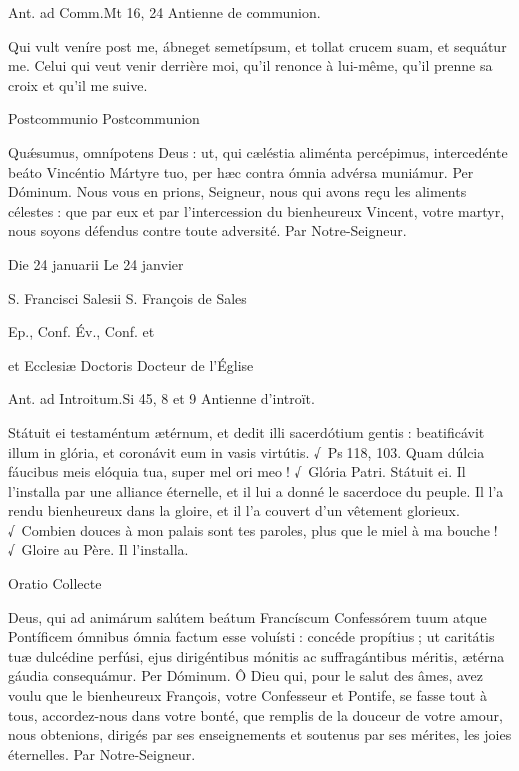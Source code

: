 \begin{paracol}{2}
Ant. ad Comm.\hfill Mt 16, 24
\switchcolumn
Antienne de communion.
\switchcolumn*

Qui vult veníre post me, ábneget semetípsum, et tollat crucem suam, et sequátur me.
\switchcolumn
Celui qui veut venir derrière moi, qu’il renonce à lui-même, qu’il prenne sa croix et qu’il me suive.
\switchcolumn*

Postcommunio
\switchcolumn
Postcommunion
\switchcolumn*

Quǽsumus, omnípotens Deus : ut,  qui cæléstia aliménta percépimus, intercedénte beáto Vincéntio Mártyre tuo, per hæc contra ómnia advérsa muniámur. Per Dóminum.
\switchcolumn
Nous vous en prions, Seigneur, nous qui  avons reçu les aliments célestes : que par eux et par l’intercession du bienheureux Vincent, votre martyr, nous soyons défendus contre toute adversité. Par Notre-Seigneur.
\switchcolumn*

Die 24 januarii
\switchcolumn
Le 24 janvier
\switchcolumn*

S. Francisci Salesii
\switchcolumn
S. François de Sales
\switchcolumn*

Ep., Conf.
\switchcolumn
Év., Conf. et
\switchcolumn*

et Ecclesiæ Doctoris
\switchcolumn
Docteur de l’Église
\switchcolumn*

Ant. ad Introitum.\hfill Si 45, 8 et 9
\switchcolumn
Antienne d’introït.
\switchcolumn*

Státuit ei testaméntum ætérnum, et dedit illi sacerdótium gentis : beatificávit illum in glória, et coronávit eum in vasis virtútis. √~Ps 118, 103. Quam dúlcia fáucibus meis elóquia tua, super mel ori meo ! √~Glória Patri. Státuit ei.
\switchcolumn
Il l’installa par une alliance éternelle, et il  lui a donné le sacerdoce du peuple. Il l’a rendu bienheureux dans la gloire, et il l’a couvert d’un vêtement glorieux. √~Combien douces à mon palais sont tes paroles, plus que le miel à ma bouche ! √~Gloire au Père. Il l’installa.
\switchcolumn*

Oratio
\switchcolumn
Collecte
\switchcolumn*

Deus, qui ad animárum salútem  beátum Francíscum Confessórem tuum atque Pontíficem ómnibus ómnia factum esse voluísti : concéde propítius ; ut caritátis tuæ dulcédine perfúsi, ejus dirigéntibus mónitis ac suffragántibus méritis, ætérna gáudia consequámur. Per Dóminum.
\switchcolumn
Ô Dieu qui, pour le salut des âmes, avez  voulu que le bienheureux François, votre Confesseur et Pontife, se fasse tout à tous, accordez-nous dans votre bonté, que remplis de la douceur de votre amour, nous obtenions, dirigés par ses enseignements et soutenus par ses mérites, les joies éternelles. Par Notre-Seigneur.
\switchcolumn*


\end{paracol}
